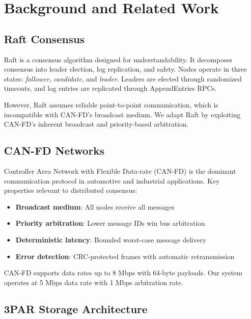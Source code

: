 \documentclass[conference,10pt]{IEEEtran}
\begin{document}
\section{Background and Related Work}
\label{sec:background}

\subsection{Raft Consensus}

Raft \cite{ongaro2014raft} is a consensus algorithm designed for understandability. It decomposes consensus into leader election, log replication, and safety. Nodes operate in three states: \textit{follower}, \textit{candidate}, and \textit{leader}. Leaders are elected through randomized timeouts, and log entries are replicated through AppendEntries RPCs.

However, Raft assumes reliable point-to-point communication, which is incompatible with CAN-FD's broadcast medium. We adapt Raft by exploiting CAN-FD's inherent broadcast and priority-based arbitration.

\subsection{CAN-FD Networks}

Controller Area Network with Flexible Data-rate (CAN-FD) is the dominant communication protocol in automotive and industrial applications. Key properties relevant to distributed consensus:

\begin{itemize}
    \item \textbf{Broadcast medium}: All nodes receive all messages
    \item \textbf{Priority arbitration}: Lower message IDs win bus arbitration
    \item \textbf{Deterministic latency}: Bounded worst-case message delivery
    \item \textbf{Error detection}: CRC-protected frames with automatic retransmission
\end{itemize}

CAN-FD supports data rates up to 8 Mbps with 64-byte payloads. Our system operates at 5 Mbps data rate with 1 Mbps arbitration rate.

\subsection{3PAR Storage Architecture}
\end{document}
